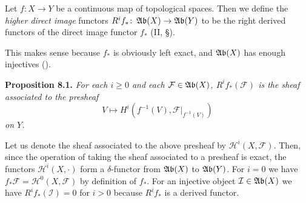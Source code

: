{\Dfn Let $f\colon X\to Y$ be a continuous map of topological spaces. Then we define the \emph{higher direct image} functors $R^if_*\colon\operatorname{\mathfrak{Ab}}(X)\to\operatorname{\mathfrak{Ab}}(Y)$ to be the right derived functors of the direct image functor $f_*$ (II, \S{}).

This makes sense because $f_*$ is obviously left exact, and $\operatorname{\mathfrak{Ab}}(X)$ has enough injectives ().

\medskip
\noindent\hypertarget{result-III-8.1}{}\textbf{Proposition 8.1.} \emph{For each $i\ge0$ and each $\mathcal F\in\operatorname{\mathfrak{Ab}}(X)$, $R^if_*(\mathcal F)$ is the sheaf associated to the presheaf}
\[
V\longmapsto H^i(f^{-1}(V),\mathcal F|_{f^{-1}(V)})
\]
\noindent\emph{on $Y$.}

\Proof Let us denote the sheaf associated to the above presheaf by $\mathcal H^i(X,\mathcal F)$. Then, since the operation of taking the sheaf associated to a presheaf is exact, the functors $\mathcal H^i(X,\cdot)$ form a $\delta$-functor from $\operatorname{\mathfrak{Ab}}(X)$ to $\operatorname{\mathfrak{Ab}}(Y)$. For $i=0$ we have $f_*\mathcal F=\mathcal H^0(X,\mathcal F)$ by definition of $f_*$. For an injective object $\mathcal I\in\operatorname{\mathfrak{Ab}}(X)$ we have $R^if_*(\mathcal I)=0$ for $i>0$ because $R^if_*$ is a derived functor.
}
